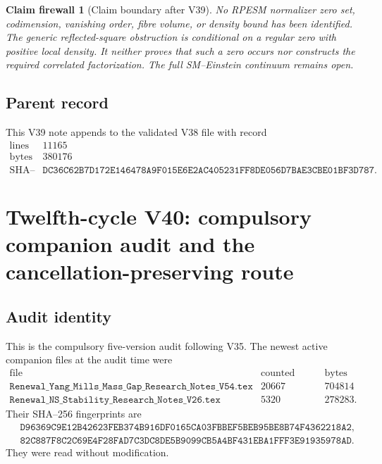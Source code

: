 \documentclass[11pt]{article}
\newtheorem{firewall}[theorem]{Claim firewall}
\theoremstyle{remark}
\begin{document}
\begin{firewall}[Claim boundary after V39]
\label{fire:v12v39-claim}
No RPESM normalizer zero set, codimension, vanishing order, fibre
volume, or density bound has been identified.  The generic
reflected-square obstruction is conditional on a regular zero with
positive local density.  It neither proves that such a zero occurs
nor constructs the required correlated factorization.  The full
SM--Einstein continuum remains open.
\end{firewall}

\subsection{Parent record}

This V39 note appends to the validated V38 file with record
\[
\begin{array}{c|c}
\text{lines}&11165\\
\text{bytes}&380176\\
\text{SHA--256}&
\texttt{DC36C62B7D172E146478A9F015E6E2AC405231FF8DE056D7BAE3CBE01BF3D787}.
\end{array}
\]


\section{Twelfth-cycle V40: compulsory companion audit and the
cancellation-preserving route}
\label{sec:v12v40}

\subsection{Audit identity}

This is the compulsory five-version audit following V35.  The newest
active companion files at the audit time were
\[
\begin{array}{c|r|r}
\text{file}&\text{counted lines}&\text{bytes}\\ \hline
\texttt{Renewal\_Yang\_Mills\_Mass\_Gap\_Research\_Notes\_V54.tex}
 &20667&704814\\
\texttt{Renewal\_NS\_Stability\_Research\_Notes\_V26.tex}
 &5320&278283.
\end{array}                                                   \tag{40.1}
\]
Their SHA--256 fingerprints are
\[
\begin{split}
 &\texttt{D96369C9E12B42623FEB374B916DF0165CA03FBBEF5BEB95BE8B74F4362218A2},
 \\
 &\texttt{82C887F8C2C69E4F28FAD7C3DC8DE5B9099CB5A4BF431EBA1FFF3E91935978AD}.
\end{split}                                                   \tag{40.2}
\]
They were read without modification.
\end{document}
